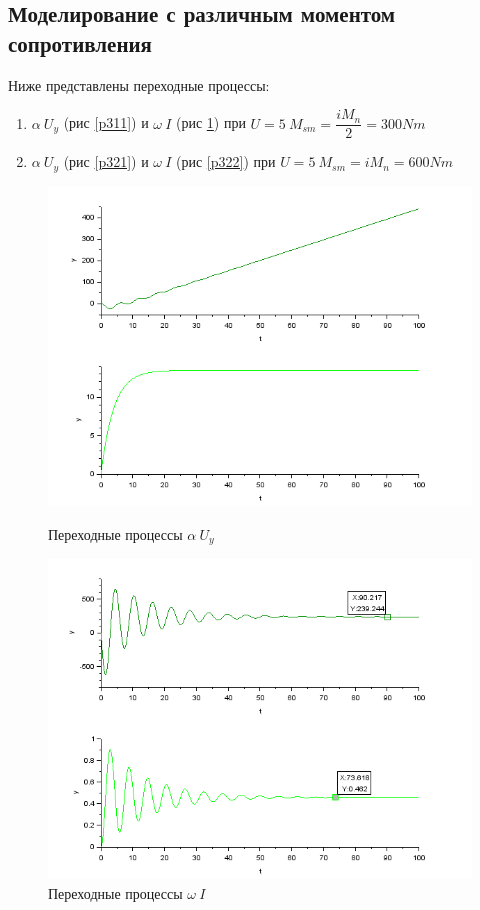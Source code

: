 \documentclass[a4paper,12pt,russian]{article} %
\begin{document}
\subsection{Моделирование с различным моментом сопротивления}
Ниже представлены переходные процессы:\\
\begin{enumerate}
	\item  $\alpha\:  U_y$ (рис \ref{p311}) и $\omega\:  I$ (рис \ref{p312})  при  $U=5\: M_{sm}=\dfrac{iM_n}{2}=300Nm$
	\item  $\alpha\:  U_y$ (рис \ref{p321}) и $\omega\:  I$ (рис \ref{p322})  при  $U=5\: M_{sm}=iM_n=600Nm$
\end{enumerate} 

\begin{figure}[H]
	\includegraphics[width=\linewidth]{311.png}
	\caption{Переходные процессы $\alpha\:  U_y$}\label{p311}
	\endminipage\hfill
	\includegraphics[width=\linewidth]{312.png}
	\caption{Переходные процессы $\omega\:  I$}\label{p312}
	\endminipage
\end{figure}
\end{document}
